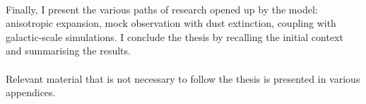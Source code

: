 \paragraph*{}
Finally, I present the various paths of research opened up by the \HubLem model: anisotropic expansion, mock observation with dust extinction, coupling with galactic-scale simulations. I conclude the thesis by recalling the initial context and summarising the results.

\paragraph*{}
Relevant material that is not necessary to follow the thesis is presented in various appendices. 